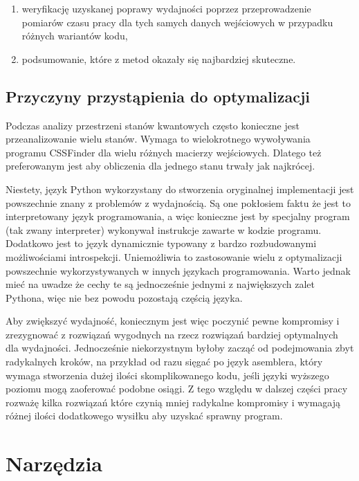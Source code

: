 \documentclass[11pt, a4paper]{article}
\begin{document}
\begin{sloppypar}
\begin{enumerate}
      \item weryfikację uzyskanej poprawy wydajności poprzez przeprowadzenie pomiarów czasu
        pracy dla tych samych danych wejściowych w przypadku różnych wariantów kodu,

      \item podsumowanie, które z metod okazały się najbardziej skuteczne.
    \end{enumerate}

    \subsection{Przyczyny przystąpienia do optymalizacji}
    Podczas analizy przestrzeni stanów kwantowych często konieczne jest przeanalizowanie
    wielu stanów. Wymaga to wielokrotnego wywoływania programu CSSFinder dla wielu
    różnych macierzy wejściowych. Dlatego też preferowanym jest aby obliczenia dla jednego
    stanu trwały jak najkrócej.

    Niestety, język Python wykorzystany do stworzenia oryginalnej implementacji jest
    powszechnie znany z problemów z wydajnością\cite{srinath2017python}. Są one
    pokłosiem faktu że jest to interpretowany język programowania, a więc konieczne jest
    by specjalny program (tak zwany interpreter) wykonywał instrukcje zawarte w kodzie programu.
    Dodatkowo jest to język dynamicznie typowany z bardzo rozbudowanymi możliwościami
    introspekcji. Uniemożliwia to zastosowanie wielu z optymalizacji powszechnie wykorzystywanych
    w innych językach programowania. Warto jednak mieć na uwadze że cechy te są
    jednocześnie jednymi z największych zalet Pythona, więc nie bez powodu pozostają częścią
    języka.

    Aby zwiększyć wydajność, koniecznym jest więc poczynić pewne kompromisy i
    zrezygnować z rozwiązań wygodnych na rzecz rozwiązań bardziej optymalnych dla
    wydajności. Jednocześnie niekorzystnym byłoby zacząć od podejmowania zbyt radykalnych
    kroków, na przykład od razu sięgać po język asemblera, który wymaga stworzenia dużej
    ilości skomplikowanego kodu, jeśli języki wyższego poziomu mogą zaoferować podobne
    osiągi. Z tego względu w dalszej części pracy rozważę kilka rozwiązań które czynią mniej
    radykalne kompromisy i wymagają różnej ilości dodatkowego wysiłku aby uzyskać sprawny
    program.

    \section{Narzędzia}

\end{sloppypar}
\end{document}
